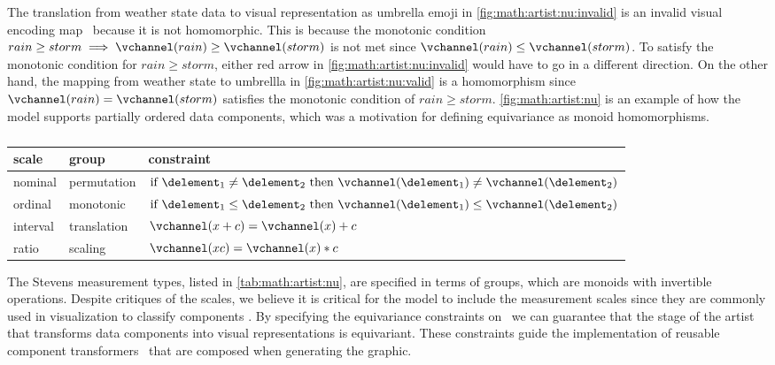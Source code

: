 \documentclass[../main.tex]{subfiles}
\begin{document}
The translation from weather state data to visual representation as umbrella emoji in \autoref{fig:math:artist:nu:invalid} is an invalid visual encoding map \vchannel\ because it is not homomorphic. This is because the monotonic condition \(rain \geq storm \implies \vchannel(rain) \geq  \vchannel(storm)\) is not met since \(\vchannel(rain) \leq\vchannel(storm)\). To satisfy the monotonic condition for $rain \geq storm$, either red arrow in \autoref{fig:math:artist:nu:invalid} would have to go in a different direction. On the other hand, the mapping from weather state to umbrellla in \autoref{fig:math:artist:nu:valid} is a homomorphism since $\vchannel(rain) = \vchannel(storm)$ satisfies the monotonic condition of $rain \geq storm$. \autoref{fig:math:artist:nu} is an example of how the model supports partially ordered data components, which was a motivation for defining equivariance as monoid homomorphisms. 

\begin{table}[H]
\centering
  \renewcommand{\arraystretch}{2}
  \begin{tabulary}{\columnwidth}{|llL|}\hline
      \textbf{scale} & \textbf{group} & \textbf{constraint}\\ \hline
      nominal & permutation &  $\text{if } \delement_1 \neq \delement_2 \text{ then } \vchannel (\delement_1) \neq\vchannel(\delement_2)$\\
      ordinal &  monotonic & $\text{if } \delement_1 \leq \delement_2 \text{ then } \vchannel (\delement_1) \leq \vchannel(\delement_2)$\\
      interval &  translation &  $\vchannel (x + c) = \vchannel(x) + c$ \\
      ratio &  scaling &  $\vchannel(xc) = \vchannel(x)*c $\\ \hline
  \end{tabulary}
  \caption{}
  \label{tab:math:artist:nu}
\end{table}

The Stevens measurement types\cite{stevensTheoryScalesMeasurement1946}, listed in \autoref{tab:math:artist:nu}, are specified in terms of groups, which are monoids with invertible operations\cite{remlingAlgebraMath5353}. Despite critiques of the scales\cite{johnsonPseudoMathematicsMentalSocial1936,thomasMathematizationNotMeasurement2014}, we believe it is critical for the model to include the measurement scales since they are commonly used in visualization to classify components \cite{munznerVisualizationAnalysisDesign2014,wilkinsonGrammarGraphics2005}. By specifying the equivariance constraints on \vchannel\, we can guarantee that the stage of the artist that transforms data components into visual representations is equivariant. These constraints guide the implementation of reusable component transformers \vchannel\ that are composed when generating the graphic. 
\end{document}
